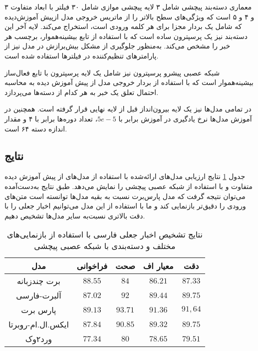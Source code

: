 معماری دسته‌بند پیچشی شامل ۳ لایه پیچشی موازی شامل ۳۰ فیلتر‌ با ابعاد متفاوت ۳ و ۴ و ۵ است که ویژگی‌های سطح بالاتر را از ماتریس خروجی مدل ازپیش‌ آموزش‌دیده که شامل یک بردار مجزا برای هر کلمه ورودی است، استخراج می‌کند. لایه آخر این دسته‌بند نیز یک پرسپترون ساده است که با استفاده از تابع بیشینه‌هموار، برچسب هر خبر را مشخص می‌کند. به‌منظور جلوگیری از مشکل بیش‌برازش در مدل نیز از پارامتر‌های تنظیم‌کننده در فیلتر‌ها استفاده شده ‌است.

شبکه عصبی پیشرو پرسپترون نیز شامل یک لایه پرسپترون با تابع فعال‌ساز بیشینه‌هموار است که با استفاده از بردار خروجی مدل از پیش آموزش‌ دیده به محاسبه احتمال تعلق یک خبر به هر کدام از دسته‌ها می‌پردازد.

در تمامی مدل‌ها نیز یک لایه بیرون‌انداز قبل از لایه‌ نهایی قرار گرفته‌ است. همچنین در آموزش مدل‌ها نرخ یادگیری در آموزش برابر با $5e-5$، تعداد دوره‌‌ها برابر با ۴ و مقدار اندازه دسته ۶۴  است.

\subsection{نتایج}
جدول \ref{table.text_result_cnn} نتایج ارزیابی مدل‌های ارائه‌شده با استفاده از مدل‌های از پیش آموزش‌ دیده متفاوت و با استفاده از شبکه عصبی پیچشی را نمایش می‌دهد. طبق نتایج به‌دست‌آمده می‌توان نتیجه گرفت که مدل پارس‌برت نسبت‌ به بقیه‌ مدل‌ها توانسته‌ است متن‌های ورودی را دقیق‌تر بازنمایی کند و ما با استفاده از این مدل می‌توانیم اخبار جعلی را با دقت بالاتری نسبت‌به سایر مدل‌ها تشخیص دهیم.

\begin{table}
	\caption{نتایج تشخیص اخبار جعلی فارسی با استفاده از بازنمایی‌های مختلف و دسته‌بندی با شبکه عصبی پیچشی}
	\label{table.text_result_cnn}
	\begin{center}
		\begin{tabular}{|c|c|c|c|c|}
			\hline
مدل & فراخوانی & صحت & معیار اف & دقت \\
			\hline
			\hline
برت چندزبانه & $88.55$ & $84$ & $86.21$ & $87.33$\\
			\hline
آلبرت-فارسی & $87.02$ & $92$ & $89.44$ & $89.75$ \\
			\hline
پارس برت & $89.13$ & $93.71$ & $91.36$ & $91,64$ \\
			\hline
ایکس.ال.ام-روبرتا & $87.84$ & $90.85$ & $89.32$ & $89.75$ \\
			\hline
ورد۲وک & $77.34$ & $80$ & $78.65$ & $79.51$ \\
			\hline
		\end{tabular}
	\end{center}
\end{table}

